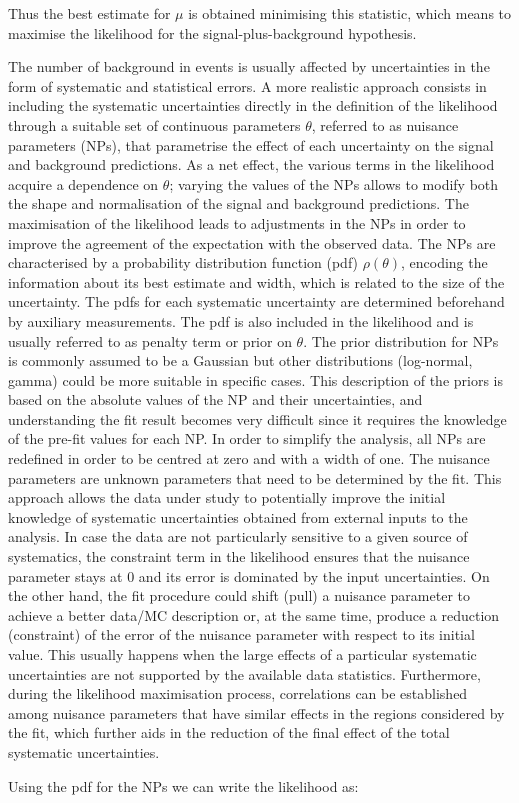 \noindent Thus the best estimate for $\mu$ is obtained minimising this statistic, which means to maximise the likelihood for the signal-plus-background hypothesis.\par
The number of background in events is usually affected by uncertainties in the form of systematic and statistical errors. A more realistic approach consists in including the systematic uncertainties directly in the definition of the likelihood through a suitable set of continuous parameters $\theta$, referred to as nuisance parameters (NPs), that parametrise the effect of each uncertainty on the signal and background predictions. As a net effect, the various terms in the likelihood acquire a dependence on $\theta$; varying the values of the NPs allows to modify both the shape and normalisation of the signal and background predictions. The maximisation of the likelihood leads to adjustments in the NPs in order to improve the agreement of the expectation with the observed data. The NPs are characterised by a probability distribution function (pdf) $\rho(\theta)$, encoding the information about its best estimate and width, which is related to the size of the uncertainty. The pdfs for each systematic uncertainty are determined beforehand by auxiliary measurements. The pdf is also included in the likelihood and is usually referred to as penalty term or prior on $\theta$. The prior distribution for NPs is commonly assumed to be a Gaussian but other distributions (log-normal, gamma) could be more suitable in specific cases. This description of the priors is based on the absolute values of the NP and their uncertainties, and understanding the fit result becomes very difficult since it requires the knowledge of the pre-fit values for each NP. In order to simplify the analysis, all NPs are redefined in order to be centred at zero and with a width of one. The nuisance parameters are unknown parameters that need to be determined by the fit. This approach allows the data under study to potentially improve the initial knowledge of systematic uncertainties obtained from external inputs to the analysis.  In case the data are not particularly sensitive to a given source of systematics, the constraint term in the likelihood ensures that the nuisance parameter stays at 0 and its error is dominated by the input uncertainties. On the other hand, the fit procedure could shift (pull) a nuisance parameter to achieve a better data/MC description or, at the same time, produce a reduction (constraint) of the error of the nuisance parameter with respect to its initial value. This usually happens when the large effects of a particular systematic uncertainties are not supported by the available data statistics. Furthermore, during the likelihood maximisation process, correlations can be established among nuisance parameters that have similar effects in the regions considered by the fit, which further aids in the reduction of the final effect of the total systematic uncertainties.\par
Using the pdf for the NPs we can write the likelihood as:

